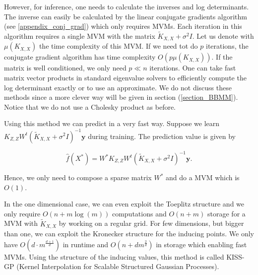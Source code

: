\documentclass[12pt,a4paper,oneside]{book}
\begin{document}
However, for inference, one needs to calculate the inverses and log determinants. The inverse can easily be calculated by the linear conjugate gradients algorithm (see \ref{appendix_conj_grad}) which  only requires MVMs. Each iteration in this algorithm requires a single MVM with the matrix $\tilde{K}_{X,X} + \sigma^2 I$. Let us denote with $\mu(K_{X,X})$ the time complexity of this MVM. If we need tot do $p$ iterations, the conjugate gradient algorithm has time complexity $O(p \mu(K_{X,X}))$. If the matrix is well conditioned, we only need $p \ll n$ iterations.
One can take fast matrix vector products in standard eigenvalue solvers to efficiently compute the log determinant exactly or to use an approximate. We do not discuss these methods since a more clever way will be  given in section (\ref{section_BBMM}). Notice that we do not use a Cholesky product as before. 


Using this method we can predict in a very fast way. Suppose we learn $K_{Z,Z} W^t (\tilde{K}_{X,X} + \sigma^2 I)^{-1} \bm{y}$ during training. The prediction value is given by

\begin{equation}\label{Function_Space_final_equation1}
\hat{f}(X^{\ast}) = W^{\ast} K_{Z,Z} W^t (\tilde{K}_{X,X} + \sigma^2 I)^{-1} \bm{y}.
\end{equation}

Hence, we only need to compose a sparse matrix $W^{\ast}$ and do a MVM which is $O(1)$. 



In the one dimensional case, we can even exploit the Toeplitz structure and we only require $O(n+ m \log(m))$ computations and $O(n+m)$ storage for a MVM with $\tilde{K}_{X,X}$ by working on a regular grid. For few dimensions, but bigger than one, we can exploit the Kronecker structure for the inducing points. We only have $O\left(d \cdot m^{\frac{d+1}{d}} \right)$ in runtime and $O(n+ d m^{\frac{2}{d}})$ in storage which enabling fast MVMs. Using the structure of the inducing values, this method is called KISS-GP (Kernel Interpolation for Scalable Structured Gaussian Processes).  
\end{document}
